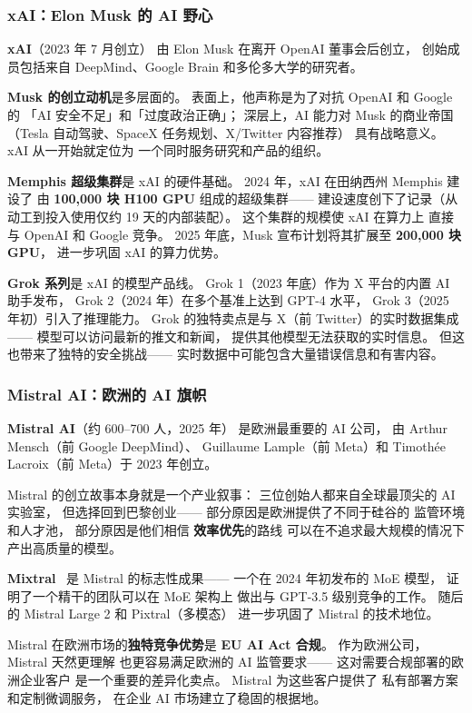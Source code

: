 \subsubsection{xAI：Elon Musk 的 AI 野心}

\textbf{xAI}（2023 年 7 月创立）
由 Elon Musk 在离开 OpenAI 董事会后创立，
创始成员包括来自 DeepMind、Google Brain
和多伦多大学的研究者。

\textbf{Musk 的创立动机}是多层面的。
表面上，他声称是为了对抗 OpenAI 和 Google 的
「AI 安全不足」和「过度政治正确」；
深层上，AI 能力对 Musk 的商业帝国
（Tesla 自动驾驶、SpaceX 任务规划、X/Twitter 内容推荐）
具有战略意义。
xAI 从一开始就定位为
一个同时服务研究和产品的组织。

\textbf{Memphis 超级集群}是 xAI 的硬件基础。
2024 年，xAI 在田纳西州 Memphis 建设了
由 \textbf{100,000 块 H100 GPU} 组成的超级集群——
建设速度创下了记录（从动工到投入使用仅约 19 天的内部装配）。
这个集群的规模使 xAI 在算力上
直接与 OpenAI 和 Google 竞争。
2025 年底，Musk 宣布计划将其扩展至
\textbf{200,000 块 GPU}，
进一步巩固 xAI 的算力优势。

\textbf{Grok 系列}是 xAI 的模型产品线。
Grok 1（2023 年底）作为 X 平台的内置 AI 助手发布，
Grok 2（2024 年）在多个基准上达到 GPT-4 水平，
Grok 3（2025 年初）引入了推理能力。
Grok 的独特卖点是与 X（前 Twitter）的实时数据集成——
模型可以访问最新的推文和新闻，
提供其他模型无法获取的实时信息。
但这也带来了独特的安全挑战——
实时数据中可能包含大量错误信息和有害内容。

\subsubsection{Mistral AI：欧洲的 AI 旗帜}

\textbf{Mistral AI}（约 600--700 人，2025 年）
是欧洲最重要的 AI 公司，
由 Arthur Mensch（前 Google DeepMind）、
Guillaume Lample（前 Meta）和
Timoth\'{e}e Lacroix（前 Meta）于 2023 年创立。

Mistral 的创立故事本身就是一个产业叙事：
三位创始人都来自全球最顶尖的 AI 实验室，
但选择回到巴黎创业——
部分原因是欧洲提供了不同于硅谷的
监管环境和人才池，
部分原因是他们相信
\textbf{效率优先}的路线
可以在不追求最大规模的情况下
产出高质量的模型。

\textbf{Mixtral}~\cite{jiang2024mixtral} 是 Mistral 的标志性成果——
一个在 2024 年初发布的 MoE 模型，
证明了一个精干的团队可以在 MoE 架构上
做出与 GPT-3.5 级别竞争的工作。
随后的 Mistral Large 2 和 Pixtral（多模态）
进一步巩固了 Mistral 的技术地位。

Mistral 在欧洲市场的\textbf{独特竞争优势}是
\textbf{EU AI Act 合规}。
作为欧洲公司，Mistral 天然更理解
也更容易满足欧洲的 AI 监管要求——
这对需要合规部署的欧洲企业客户
是一个重要的差异化卖点。
Mistral 为这些客户提供了
私有部署方案和定制微调服务，
在企业 AI 市场建立了稳固的根据地。

